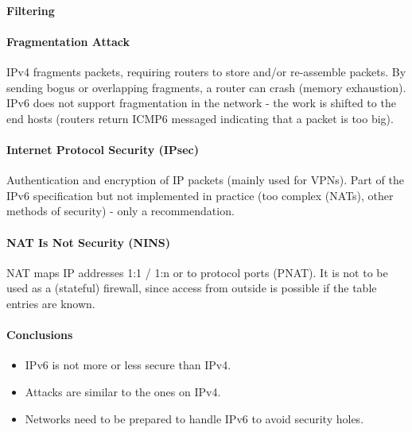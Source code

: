 \paragraph{Filtering}

\paragraph{Fragmentation Attack}
IPv4 fragments packets, requiring routers to store and/or re-assemble packets. By sending bogus or overlapping fragments, a router can crash (memory exhaustion). IPv6 does not support fragmentation in the network - the work is shifted to the end hosts (routers return ICMP6 messaged indicating that a packet is too big).

\paragraph{Internet Protocol Security (IPsec)}
Authentication and encryption of IP packets (mainly used for VPNs). Part of the IPv6 specification but not implemented in practice (too complex (NATs), other methods of security) - only a recommendation.

\paragraph{NAT Is Not Security (NINS)}
NAT maps IP addresses 1:1 / 1:n or to protocol ports (PNAT). It is not to be used as a (stateful) firewall, since access from outside is possible if the table entries are known. %

\paragraph{Conclusions}
\begin{itemize}
    \item IPv6 is not more or less secure than IPv4.
    \item Attacks are similar to the ones on IPv4.
    \item Networks need to be prepared to handle IPv6 to avoid security holes.
\end{itemize}